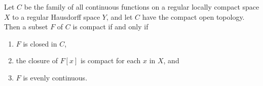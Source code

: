 Let $C$ be the family of all continuous functions on a regular locally compact space $X$ to a regular Hausdorff space $Y$, and let $C$ have the compact open topology. Then a subset $F$ of $C$ is compact if and only if

\begin{enumerate}
\item[(a)] $F$ is closed in $C$,
\item[(b)] the closure of $F[x]$ is compact for each $x$ in $X$, and
\item[(c)] $F$ is evenly continuous.
\end{enumerate}
